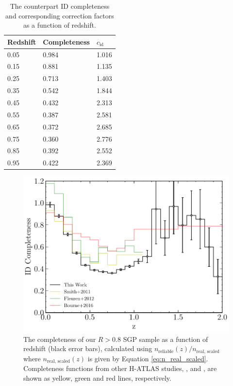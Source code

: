 \begin{table}
    \centering
    \begin{tabular}{p{4.5cm}|p{2.5cm}|p{2.5cm}}
        \hline
        \hline
        Redshift & Completeness & $c_{\textrm{id}}$ \\
        \hline
        \hline
        0.05 & 0.984 & 1.016 \\
        0.15 & 0.881 & 1.135 \\
        0.25 & 0.713 & 1.403 \\
        0.35 & 0.542 & 1.844 \\
        0.45 & 0.432 & 2.313 \\
        0.55 & 0.387 & 2.581 \\
        0.65 & 0.372 & 2.685 \\
        0.75 & 0.360 & 2.776 \\
        0.85 & 0.392 & 2.552 \\
        0.95 & 0.422 & 2.369 \\
        \hline
    \end{tabular}
    \caption[ID completeness as a function of redshift]{The counterpart ID completeness and corresponding correction factors as a function of redshift.}
    \label{tab:id_completeness_table}
\end{table}

\begin{figure}
	\centering
	\includegraphics[width=0.75\columnwidth]{Figures/id_completeness.pdf}
	\caption[Completeness of our reliable SGP sample as a function of redshift]{The completeness of our $R > 0.8$ SGP sample as a function of redshift (black error bars), calculated using $n_{\textrm{reliable}}(z)/n_{\textrm{real, scaled}}$ where $n_{\textrm{real, scaled}}(z)$ is given by Equation \ref{eq:n_real_scaled}. Completeness functions from other H-ATLAS studies, \citealt{Smith_2011}, \citealt{Fleuren_2012} and \citealt{Bourne_2016}, are shown as yellow, green and red lines, respectively.}
	\label{fig:id_completeness}
\end{figure}

